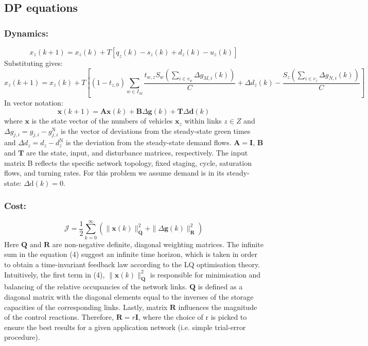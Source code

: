 \documentclass[11pt]{article}
\begin{document}
\subsection{DP equations}
\subsubsection*{Dynamics:}
\begin{equation}
x_{z}(k+1)=x_{z}(k)+T\left[q_{z}(k)-s_{z}(k)+d_{z}(k)-u_{z}(k)\right]
\end{equation}
Substituting gives:
\begin{equation}
x_{z}(k+1) =x_{z}(k)+T\left[\left(1-t_{z, 0}\right) \sum_{w \in I_{M}} \frac{t_{w, z} S_{w}\left(\sum_{i \in v_{w}} \Delta g_{M, i}(k)\right)}{C} +\Delta d_{z}(k)-\frac{S_{z}\left(\sum_{i \in v_{z}} \Delta g_{N, i}(k)\right)}{C} \right]
\end{equation}
In vector notation: 
\begin{equation}
\mathbf{x}(k+1)=\mathbf{A} \mathbf{x}(k)+\mathbf{B} \Delta \mathbf{g}(k)+\mathbf{T} \Delta \mathbf{d}(k)
\end{equation}
where $ \mathbf{x} $ is the state vector of the numbers of vehicles $ \mathbf{x}_z$ within links $z \in Z$ and $\Delta g_{j, i}=g_{j, i}-g_{j, i}^{\mathrm{N}}$ is the vector of deviations from the steady-state green times and $\Delta d_{z}=d_{z}-d_{z}^{\mathrm{N}}$ is the deviation from the steady-state demand flows. $\mathbf{A}= \mathbf{I}$, $\mathbf{B}$ and  $\mathbf{T}$ are the state, input, and disturbance matrices, respectively. The input matrix B reflects the specific network topology, fixed staging, cycle, saturation flows, and turning rates. For this problem we assume demand is in its steady-state: $\Delta \mathrm{d}(k)=0$.
\subsubsection*{Cost:}
\begin{equation}
\mathcal{J}=\frac{1}{2} \sum_{k=0}^{\infty}\left(\|\mathbf{x}(k)\|_{\mathbf{Q}}^{2}+\|\Delta \mathbf{g}(k)\|_{\mathbf{R}}^{2}\right)
\end{equation}
Here $\mathbf{Q}$ and $\mathbf{R}$ are non-negative definite, diagonal weighting matrices. The infinite sum in the equation (4) suggest an infinite time horizon, which is taken in order to obtain a time-invariant feedback law according to the LQ optimisation theory. Intuitively,  the first term in (4), $\|\mathbf{x}(k)\|_{\mathbf{Q}}^{2}$ is responsible for minimisation and balancing of the relative occupancies of the network links. $\mathbf{Q}$ is defined as a diagonal matrix with the diagonal elements equal to the inverses of the storage capacities of the corresponding links. Lastly, matrix $\mathbf{R}$ influences the magnitude of the control reactions. Therefore,  $\mathbf{R}=r\mathbf{I}$, where the choice of r is picked to ensure the best results for a given application network (i.e. simple trial-error procedure).
\end{document}
